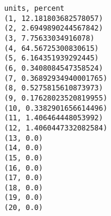 
\begin{verbatim}
units, percent
(1, 12.181803682578057)
(2, 2.6949890244567842)
(3, 7.75633034916078)
(4, 64.56725300830615)
(5, 6.164351939292445)
(6, 0.3408084547358524)
(7, 0.36892934940001765)
(8, 0.5275815610873973)
(9, 0.17628023520819955)
(10, 0.3382901656614496)
(11, 1.406464448053992)
(12, 1.4060447332082584)
(13, 0.0)
(14, 0.0)
(15, 0.0)
(16, 0.0)
(17, 0.0)
(18, 0.0)
(19, 0.0)
(20, 0.0)

\end{verbatim}